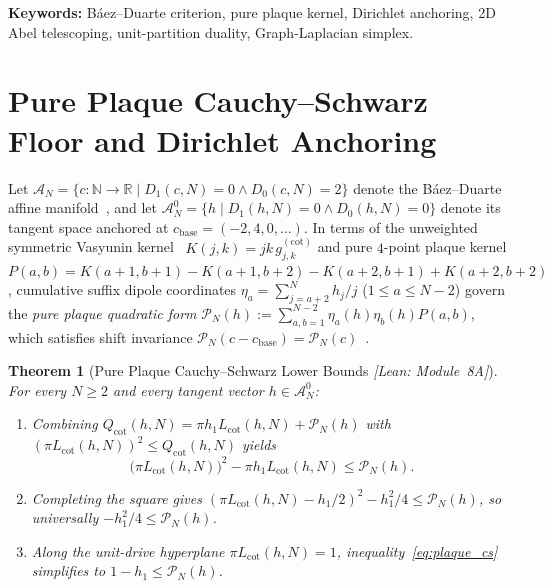 \documentclass[10pt,a4paper]{article}
\newtheorem{theorem}{Theorem}[section]
\theoremstyle{definition}
\begin{document}
\noindent\textbf{Keywords:} B\'aez--Duarte criterion, pure plaque kernel, Dirichlet anchoring, 2D Abel telescoping, unit-partition duality, Graph-Laplacian simplex.

\section{Pure Plaque Cauchy--Schwarz Floor and Dirichlet Anchoring}\label{sec:anchor}

Let $\mathcal{A}_N = \{c : \mathbb{N} \to \mathbb{R} \mid D_1(c,N) = 0 \land D_0(c,N) = 2\}$ denote the B\'aez--Duarte affine manifold~\cite{BaezDuarte2003}, and let $\mathcal{A}_N^0 = \{h \mid D_1(h,N) = 0 \land D_0(h,N) = 0\}$ denote its tangent space anchored at $c_{\mathrm{base}} = (-2, 4, 0, \dots)$. In terms of the unweighted symmetric Vasyunin kernel~\cite{Vasyunin1995} $K(j,k) = jk \, g_{j,k}^{(\mathrm{cot})}$ and pure $4$-point plaque kernel $P(a,b) = K(a+1,b+1) - K(a+1,b+2) - K(a+2,b+1) + K(a+2,b+2)$, cumulative suffix dipole coordinates $\eta_a = \sum_{j=a+2}^N h_j / j$ ($1 \le a \le N-2$) govern the \emph{pure plaque quadratic form} $\mathcal{P}_N(h) := \sum_{a,b=1}^{N-2} \eta_a(h) \eta_b(h) P(a,b)$, which satisfies shift invariance $\mathcal{P}_N(c - c_{\mathrm{base}}) = \mathcal{P}_N(c)$~\cite{MunawerPaperJ2026}.

\begin{theorem}[Pure Plaque Cauchy--Schwarz Lower Bounds \emph{[Lean: Module~8A]}]\label{thm:plaque_cs}
For every $N \ge 2$ and every tangent vector $h \in \mathcal{A}_N^0$:
\begin{enumerate}[leftmargin=1.8em,itemsep=2pt]
\item Combining $Q_{\mathrm{cot}}(h,N) = \pi h_1 L_{\mathrm{cot}}(h,N) + \mathcal{P}_N(h)$ with $(\pi L_{\mathrm{cot}}(h,N))^2 \le Q_{\mathrm{cot}}(h,N)$ yields
\begin{equation}\label{eq:plaque_cs}
\bigl(\pi L_{\mathrm{cot}}(h,N)\bigr)^2 - \pi h_1 L_{\mathrm{cot}}(h,N) \le \mathcal{P}_N(h).
\end{equation}
\item Completing the square gives $(\pi L_{\mathrm{cot}}(h,N) - h_1/2)^2 - h_1^2/4 \le \mathcal{P}_N(h)$, so universally $-h_1^2 / 4 \le \mathcal{P}_N(h)$.
\item Along the unit-drive hyperplane $\pi L_{\mathrm{cot}}(h,N) = 1$, inequality~\eqref{eq:plaque_cs} simplifies to $1 - h_1 \le \mathcal{P}_N(h)$.
\end{enumerate}
\end{theorem}
\end{document}
